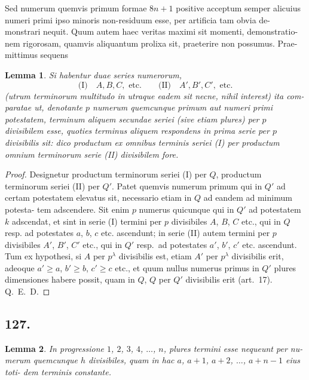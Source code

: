 \documentclass[12pt,a4paper]{article}
\theoremstyle{plain}
\newtheorem{lemma}{Lemma}[section]
\theoremstyle{definition}
\theoremstyle{remark}
\begin{document}
Sed numerum quemvis primum formae $8n+1$ positive acceptum semper
alicuius numeri primi ipso minoris non-residuum esse, per artificia tam obvia de-
monstrari nequit. Quum autem haec veritas maximi sit momenti, demonstratio-
nem rigorosam, quamvis aliquantum prolixa sit, praeterire non possumus. Prae-
mittimus sequens

\begin{lemma}
Si habentur duae series numerorum,
\[
\text{(I)} \quad A, B, C, \text{ etc.} \qquad \text{(II)} \quad A', B', C', \text{ etc.}
\]
(utrum terminorum multitudo in utraque eadem sit necne, nihil interest) ita com-
paratae ut, denotante $p$ numerum quemcunque primum aut numeri primi potestatem,
terminum aliquem secundae seriei (sive etiam plures) per $p$ divisibilem esse,
quoties terminus aliquem respondens in prima serie per $p$ divisibilis sit: dico
productum ex omnibus terminis seriei \emph{(I)} per productum omnium terminorum
serie \emph{(II)} divisibilem fore.
\end{lemma}

\begin{proof}
Designetur productum terminorum seriei (I) per $Q$, productum terminorum
seriei (II) per $Q'$. Patet quemvis numerum primum qui in $Q'$ ad certam
potestatem elevatus sit, necessario etiam in $Q$ ad eandem ad minimum potesta-
tem adscendere. Sit enim $p$ numerus quicunque qui in $Q'$ ad potestatem $k$
adscendat, et sint in serie (I) termini per $p$ divisibiles $A$, $B$, $C$ etc., qui
in $Q$ resp. ad potestates $a$, $b$, $c$ etc. ascendunt; in serie (II) autem termini
per $p$ divisibiles $A'$, $B'$, $C'$ etc., qui in $Q'$ resp.\ ad potestates $a'$, $b'$, $c'$
etc. ascendunt. Tum ex hypothesi, si $A$ per $p^\lambda$ divisibilis est, etiam $A'$ per
$p^\lambda$ divisibilis erit, adeoque $a' \geq a$, $b' \geq b$, $c' \geq c$ etc., et quum nullus
numerus primus in $Q'$ plures dimensiones habere possit, quam in $Q$, $Q$ per $Q'$
divisibilis erit (art.~17). Q.~E.~D.
\end{proof}

\subsection*{127.}

\begin{lemma}
In progressione $1$, $2$, $3$, $4$, $\ldots$, $n$, plures termini esse nequeunt per nu-
merum quemcunque $h$ divisibiles, quam in hac $a$, $a+1$, $a+2$, $\ldots$, $a+n-1$ eius toti-
dem terminis constante.
\end{lemma}
\end{document}
